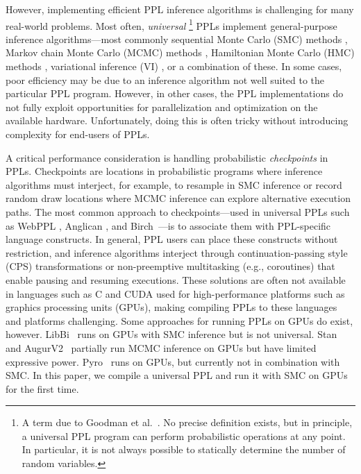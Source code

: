 \documentclass[runningheads]{llncs}
\begin{document}
However, implementing efficient PPL inference algorithms is challenging for many real-world problems.
Most often, \emph{universal}%
\footnote{%
   A term due to Goodman et al.~\cite{goodman2008church}. No precise definition exists, but in principle, a universal PPL program can perform probabilistic operations at any point. In particular, it is not always possible to statically determine the number of random variables.
} PPLs implement general-purpose inference algorithms---most commonly sequential Monte Carlo (SMC) methods \cite{doucet2001sequential}, Markov chain Monte Carlo (MCMC) methods \cite{gilks1995markov}, Hamiltonian Monte Carlo (HMC) methods \cite{carpenter2017stan}, variational inference (VI) \cite{wainwright2008graphical}, or a combination of these.
In some cases, poor efficiency may be due to an inference algorithm not well suited to the particular PPL program.
However, in other cases, the PPL implementations do not fully exploit opportunities for parallelization and optimization on the available hardware.
Unfortunately, doing this is often tricky without introducing complexity for end-users of PPLs.

A critical performance consideration is handling probabilistic \emph{checkpoints} \cite{tolpin2016design} in PPLs.
Checkpoints are locations in probabilistic programs where inference algorithms must interject, for example, to resample in SMC inference or record random draw locations where MCMC inference can explore alternative execution paths.
The most common approach to checkpoints---used in universal PPLs such as WebPPL \cite{goodman2014design}, Anglican \cite{wood2014new}, and Birch~\cite{murray2018automated}---is to associate them with PPL-specific language constructs.
In general, PPL users can place these constructs without restriction, and inference algorithms interject through continuation-passing style (CPS) transformations \cite{appel1991compiling,goodman2014design,wood2014new} or non-preemptive multitasking \cite{murray2018automated} (e.g., coroutines) that enable pausing and resuming executions.
These solutions are often not available in languages such as C and CUDA \cite{cuda2021} used for high-performance platforms such as graphics processing units (GPUs), making compiling PPLs to these languages and platforms challenging.
Some approaches for running PPLs on GPUs do exist, however.
LibBi~\cite{murray2013bayesian} runs on GPUs with SMC inference but is not universal.
Stan~\cite{carpenter2017stan} and AugurV2~\cite{huang2017compiling} partially run MCMC inference on GPUs but have limited expressive power.
Pyro~\cite{bingham2019pyro} runs on GPUs, but currently not in combination with SMC.
In this paper, we compile a universal PPL and run it with SMC on GPUs for the first time.
\end{document}
